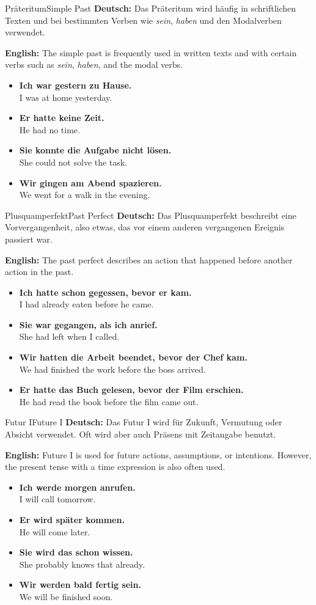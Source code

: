 \documentclass[a4paper,11pt]{article}
\newcommand{\GermanText}[1]{\textbf{Deutsch: }#1\par}
\newcommand{\EnglishText}[1]{{\color{SoftGray}\textbf{English: }#1\par}}
\newcommand{\ExampleItem}[2]{\item \textbf{#1}\\{\color{SoftGray}#2}}
\begin{document}
\begin{grammarentry}{Präteritum}{Simple Past}
    \GermanText{Das Präteritum wird häufig in schriftlichen Texten und bei bestimmten Verben wie \textit{sein}, \textit{haben} und den Modalverben verwendet.}
    \EnglishText{The simple past is frequently used in written texts and with certain verbs such as \textit{sein}, \textit{haben}, and the modal verbs.}
    \begin{exbox}
        \begin{itemize}
            \ExampleItem{Ich war gestern zu Hause.}{I was at home yesterday.}
            \ExampleItem{Er hatte keine Zeit.}{He had no time.}
            \ExampleItem{Sie konnte die Aufgabe nicht lösen.}{She could not solve the task.}
            \ExampleItem{Wir gingen am Abend spazieren.}{We went for a walk in the evening.}
        \end{itemize}
    \end{exbox}
\end{grammarentry}

\begin{grammarentry}{Plusquamperfekt}{Past Perfect}
    \GermanText{Das Plusquamperfekt beschreibt eine Vorvergangenheit, also etwas, das vor einem anderen vergangenen Ereignis passiert war.}
    \EnglishText{The past perfect describes an action that happened before another action in the past.}
    \begin{exbox}
        \begin{itemize}
            \ExampleItem{Ich hatte schon gegessen, bevor er kam.}{I had already eaten before he came.}
            \ExampleItem{Sie war gegangen, als ich anrief.}{She had left when I called.}
            \ExampleItem{Wir hatten die Arbeit beendet, bevor der Chef kam.}{We had finished the work before the boss arrived.}
            \ExampleItem{Er hatte das Buch gelesen, bevor der Film erschien.}{He had read the book before the film came out.}
        \end{itemize}
    \end{exbox}
\end{grammarentry}

\begin{grammarentry}{Futur I}{Future I}
    \GermanText{Das Futur I wird für Zukunft, Vermutung oder Absicht verwendet. Oft wird aber auch Präsens mit Zeitangabe benutzt.}
    \EnglishText{Future I is used for future actions, assumptions, or intentions. However, the present tense with a time expression is also often used.}
    \begin{exbox}
        \begin{itemize}
            \ExampleItem{Ich werde morgen anrufen.}{I will call tomorrow.}
            \ExampleItem{Er wird später kommen.}{He will come later.}
            \ExampleItem{Sie wird das schon wissen.}{She probably knows that already.}
            \ExampleItem{Wir werden bald fertig sein.}{We will be finished soon.}
        \end{itemize}
    \end{exbox}
\end{grammarentry}
\end{document}
